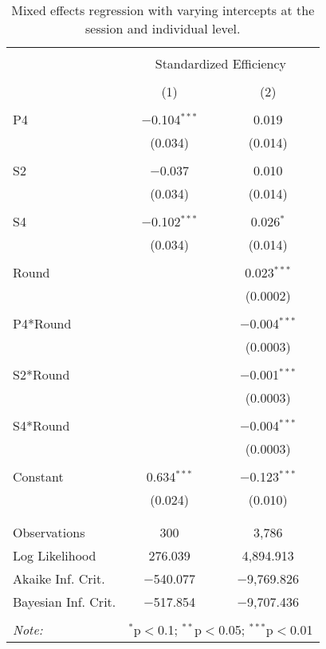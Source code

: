 
\begin{table}[!htbp] \centering 
  \caption{Mixed effects regression with varying intercepts at the session and individual level.} 
  \label{} 
\begin{tabular}{@{\extracolsep{5pt}}lcc} 
\\[-1.8ex]\hline 
\hline \\[-1.8ex] 
 & \multicolumn{2}{c}{Standardized Efficiency} \\ 
\cline{2-3} 
\\[-1.8ex] & (1) & (2)\\ 
\hline \\[-1.8ex] 
 P4 & $-$0.104$^{***}$ & 0.019 \\ 
  & (0.034) & (0.014) \\ 
  & & \\ 
 S2 & $-$0.037 & 0.010 \\ 
  & (0.034) & (0.014) \\ 
  & & \\ 
 S4 & $-$0.102$^{***}$ & 0.026$^{*}$ \\ 
  & (0.034) & (0.014) \\ 
  & & \\ 
 Round &  & 0.023$^{***}$ \\ 
  &  & (0.0002) \\ 
  & & \\ 
 P4*Round &  & $-$0.004$^{***}$ \\ 
  &  & (0.0003) \\ 
  & & \\ 
 S2*Round &  & $-$0.001$^{***}$ \\ 
  &  & (0.0003) \\ 
  & & \\ 
 S4*Round &  & $-$0.004$^{***}$ \\ 
  &  & (0.0003) \\ 
  & & \\ 
 Constant & 0.634$^{***}$ & $-$0.123$^{***}$ \\ 
  & (0.024) & (0.010) \\ 
  & & \\ 
\hline \\[-1.8ex] 
Observations & 300 & 3,786 \\ 
Log Likelihood & 276.039 & 4,894.913 \\ 
Akaike Inf. Crit. & $-$540.077 & $-$9,769.826 \\ 
Bayesian Inf. Crit. & $-$517.854 & $-$9,707.436 \\ 
\hline 
\hline \\[-1.8ex] 
\textit{Note:}  & \multicolumn{2}{r}{$^{*}$p$<$0.1; $^{**}$p$<$0.05; $^{***}$p$<$0.01} \\ 
\end{tabular} 
\end{table} 

